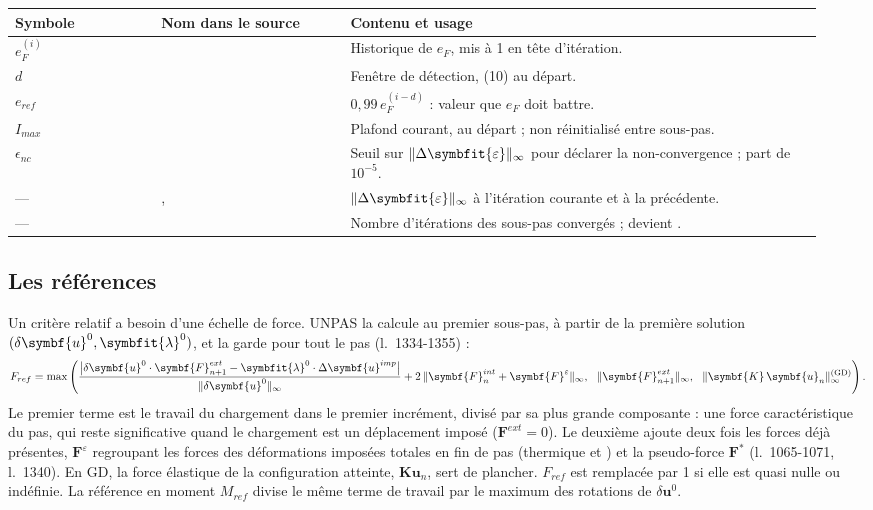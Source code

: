 \documentclass[11pt,a4paper]{article}
\makeatletter
\numberwithin{equation}{section}
\newcommand{\src}[1]{\texttt{\detokenize{#1}}}          %
\newcommand{\pr}[1]{\textsf{#1}}                        %
\newcommand{\lig}[1]{l.~#1}
\newcommand{\vc}[1]{\symbf{#1}}                         %
\newcommand{\eps}{\varepsilon}
\newcommand{\Deps}{\Delta\symbfit{\varepsilon}}
\newcommand{\vg}[1]{\symbfit{#1}}                       %
\newcommand{\norminf}[1]{\lVert #1\rVert_{\infty}}
\newenvironment{glossaire}[1][Glossaire]{%
  \par\smallskip\needspace{7\baselineskip}\noindent{\sffamily\bfseries\small #1}\par\nopagebreak
  \small
  \renewcommand{\arraystretch}{1.18}
  \begin{longtable}{@{}>{\raggedright\arraybackslash}p{0.17\linewidth}
                     >{\raggedright\arraybackslash}p{0.22\linewidth}
                     >{\raggedright\arraybackslash}p{0.555\linewidth}@{}}
  \toprule
  \textbf{Symbole} & \textbf{Nom dans le source} & \textbf{Contenu et usage}\\
  \midrule\endhead
  \bottomrule\endfoot}
  {\end{longtable}\addtocounter{table}{-1}\normalsize\vspace{-0.4em}}
\makeatother
\begin{document}
\begin{glossaire}
$e_F^{(i)}$ & \src{TABCONV.i} & Historique de $e_F$, mis à 1 en tête d'itération.\\
$d$ & \src{DLTAIT} & Fenêtre de détection, \src{DELTAITER} (10) au départ.\\
$e_{ref}$ & \src{XCONVREF} & $0{,}99\,e_F^{(i-d)}$ : valeur que $e_F$ doit battre.\\
$I_{max}$ & \src{ZMAXIT} & Plafond courant, \src{MAXITERATION} au départ ; non réinitialisé entre sous-pas.\\
$\epsilon_{nc}$ & \src{zprecnc} & Seuil sur $\norminf{\Deps}$ pour déclarer la non-convergence ; part de $10^{-5}$.\\
— & \src{DPSMAX}, \src{DPSMAXP} & $\norminf{\Deps}$ à l'itération courante et à la précédente.\\
— & \src{ZNITE} & Nombre d'itérations des sous-pas convergés ; devient \src{NOMBRE_ITERATIONS}.\\
\end{glossaire}

\subsection{Les références}
\label{sec:fref}

Un critère relatif a besoin d'une échelle de force.
\pr{UNPAS} la calcule au premier sous-pas, à partir de la première solution $(\delta\vc u^{0}, \vg\lambda^{0})$, et la garde pour tout le pas (\lig{1334-1355}) :
\begin{equation}
\label{eq:fref}
F_{ref} = \max\left(
\frac{\big|\delta\vc u^{0}\cdot\vc F^{ext}_{n+1} - \vg\lambda^{0}\cdot\Delta\vc u^{imp}\big|}{\norminf{\delta\vc u^{0}}} + 2\,\norminf{\vc F^{int}_n + \vc F^{\eps}},\ \
\norminf{\vc F^{ext}_{n+1}},\ \
\norminf{\vc K\,\vc u_n}^{\text{(GD)}}\right).
\end{equation}
Le premier terme est le travail du chargement dans le premier incrément, divisé par sa plus grande composante : une force caractéristique du pas, qui reste significative quand le chargement est un déplacement imposé ($\vc F^{ext} = 0$).
Le deuxième ajoute deux fois les forces déjà présentes, $\vc F^{\eps}$ regroupant les forces des déformations imposées totales en fin de pas (thermique et \src{DEFI}) et la pseudo-force $\vc F^{*}$ (\lig{1065-1071}, \lig{1340}).
En GD, la force élastique de la configuration atteinte, $\vc K\vc u_n$, sert de plancher.
$F_{ref}$ est remplacée par 1 si elle est quasi nulle ou indéfinie.
La référence en moment $M_{ref}$ divise le même terme de travail par le maximum des rotations de $\delta\vc u^{0}$.
\end{document}
